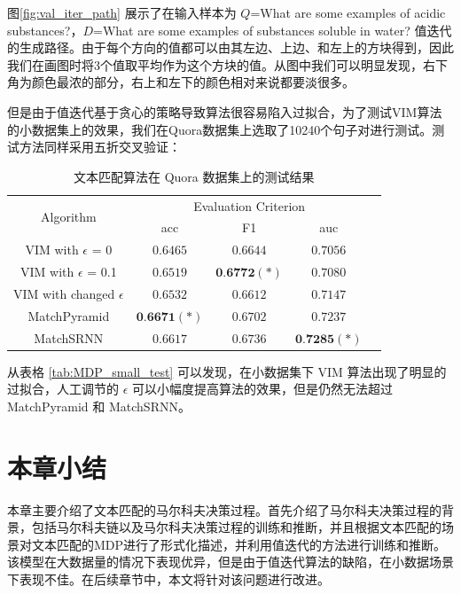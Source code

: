 图\ref{fig:val_iter_path} 展示了在输入样本为 $Q$=What are some examples of acidic substances?，$D$=What are some examples of substances soluble in water? 值迭代的生成路径。由于每个方向的值都可以由其左边、上边、和左上的方块得到，因此我们在画图时将3个值取平均作为这个方块的值。从图中我们可以明显发现，右下角为颜色最浓的部分，右上和左下的颜色相对来说都要淡很多。

但是由于值迭代基于贪心的策略导致算法很容易陷入过拟合，为了测试VIM算法的小数据集上的效果，我们在Quora数据集上选取了10240个句子对进行测试。测试方法同样采用五折交叉验证：
\begin{table}[htbp]
\caption{文本匹配算法在 Quora 数据集上的测试结果}\label{tab:MDP_test}
\vspace{0.5em}\centering\wuhao
\begin{tabular}{ccccc}
\toprule[1.5pt]
	\multirow{2}{*}{Algorithm} &
        \multicolumn{3}{c}{\multirow{1}{*}{Evaluation Criterion}} \\
        \cline{2-4} & acc & F1 & auc \\
        \hline
        VIM with $\epsilon$ = 0 & $0.6465$ & $0.6644$ & $0.7056$ \\
        VIM with $\epsilon$ = 0.1 & $0.6519$ & $\textbf{0.6772}(*)$ & $0.7080$ \\
        VIM with changed $\epsilon$ & $0.6532$ & $0.6612$ & $0.7147$ \\
        \hline
        MatchPyramid & $\textbf{0.6671}(*)$ & $0.6702$ & $0.7237$ \\
        \hline
        MatchSRNN & $0.6617$ & $0.6736$ & $\textbf{0.7285}(*)$\\
        \bottomrule[1.5pt]
\end{tabular}
\vspace{\baselineskip}
\end{table}

从表格 \ref{tab:MDP_small_test} 可以发现，在小数据集下 VIM 算法出现了明显的过拟合，人工调节的 $\epsilon$ 可以小幅度提高算法的效果，但是仍然无法超过 MatchPyramid 和 MatchSRNN。

\section{本章小结}
本章主要介绍了文本匹配的马尔科夫决策过程。首先介绍了马尔科夫决策过程的背景，包括马尔科夫链以及马尔科夫决策过程的训练和推断，并且根据文本匹配的场景对文本匹配的MDP进行了形式化描述，并利用值迭代的方法进行训练和推断。该模型在大数据量的情况下表现优异，但是由于值迭代算法的缺陷，在小数据场景下表现不佳。在后续章节中，本文将针对该问题进行改进。

